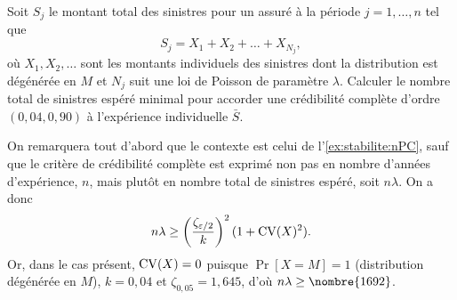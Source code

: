 \begin{exercice}
  Soit $S_j$ le montant total des sinistres pour un assuré à la
  période $j = 1, \dots, n$ tel que
  \begin{displaymath}
    S_j = X_1 + X_2 + \dots + X_{N_j},
  \end{displaymath}
  où $X_1, X_2, \dots$ sont les montants individuels des sinistres
  dont la distribution est dégénérée en $M$ et $N_j$ suit une loi de
  Poisson de paramètre $\lambda$. Calculer le nombre total de
  sinistres espéré minimal pour accorder une crédibilité complète
  d'ordre $(0,04, 0,90)$ à l'expérience individuelle $\bar{S}$.
  \begin{rep}
  \end{rep}
  \begin{sol}
    On remarquera tout d'abord que le contexte est celui de
    l'\autoref{ex:stabilite:nPC}, sauf que le critère de crédibilité
    complète est exprimé non pas en nombre d'années d'expérience, $n$,
    mais plutôt en nombre total de sinistres espéré, soit $n \lambda$.
    On a donc
    \begin{displaymath}
      n \lambda \geq
      \left(
        \frac{\zeta_{\varepsilon/2}}{k}
      \right)^2
      (1 + \operatorname{CV}(X)^2).
    \end{displaymath}
    Or, dans le cas présent, $\operatorname{CV}(X) = 0$ puisque $\Pr[X = M]
    = 1$ (distribution dégénérée en $M$), $k = 0,04$ et $\zeta_{0,05}
    = 1,645$, d'où $n \lambda \geq \nombre{1692}$.
  \end{sol}
\end{exercice}

